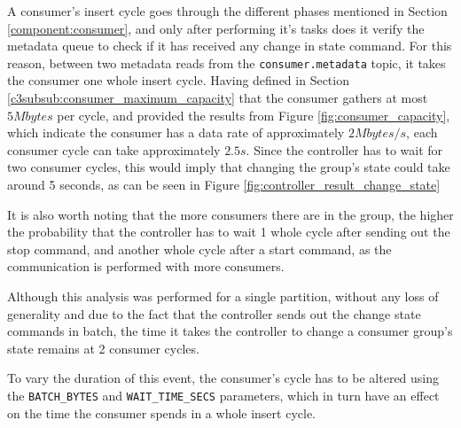 A consumer's insert cycle goes through the different phases mentioned in Section
\ref{component:consumer}, and only after performing it's tasks does it verify
the metadata queue to check if it has received any change in state command. For
this reason, between two metadata reads from the \lstinline{consumer.metadata}
topic, it takes the consumer one whole insert cycle. Having defined in Section
\ref{c3subsub:consumer_maximum_capacity} that the consumer gathers at most
$5Mbytes$ per cycle, and provided the results from Figure
\ref{fig:consumer_capacity}, which indicate the consumer has a data rate of
approximately $2Mbytes/s$, each consumer cycle can take approximately $2.5s$.
Since the controller has to wait for two consumer cycles, this would imply that
changing the group's state could take around 5 seconds, as can be seen in Figure
\ref{fig:controller_result_change_state}

It is also worth noting that the more consumers there are in the group, the
higher the probability that the controller has to wait 1 whole cycle after
sending out the stop command, and another whole cycle after a start command, as
the communication is performed with more consumers.

Although this analysis was performed for a single partition, without any loss of
generality and due to the fact that the controller sends out the change state
commands in batch, the time it takes the controller to change a consumer group's
state remains at 2 consumer cycles.

To vary the duration of this event, the consumer's cycle has to be altered using
the \lstinline{BATCH_BYTES} and \lstinline{WAIT_TIME_SECS} parameters, which in
turn have an effect on the time the consumer spends in a whole insert cycle.
